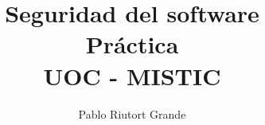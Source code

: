 \documentclass[a4paper,oneside]{article}
\author{Pablo Riutort Grande}
\title{
	Seguridad del software\\
	\vspace{1cm}
	\textbf{Práctica}
	\vspace{1cm}\\UOC - MISTIC
}
\begin{document}
\maketitle
\pagebreak
\tableofcontents
\lstlistoflistings
\listoffigures

\pagebreak

\end{document}
